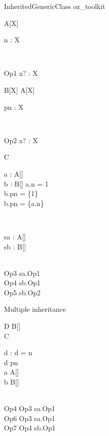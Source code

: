 \begin{zsection}
  \SECTION InheritedGenericClass \parents oz\_toolkit
\end{zsection}

\begin{class}{A[X]}
  \begin{state}
    n : X
  \end{state}\\
  \begin{op}{Op1}
    x? : X
  \end{op}
\end{class}

\begin{class}{B[X]}
  A[X]\\
  \begin{state}
    pn : \power X
  \end{state}\\
  \begin{op}{Op2}
    x? : \power X
  \end{op}
\end{class}

\begin{class}{C}
  \begin{axdef}
    a : A[\nat]\\
    b : B[\nat]
  \where
    a.n = 1\\
    b.pn = \{1\}\\
    b.pn = \{a.n\}
  \end{axdef}\\
  \begin{state}
    sa : A[\nat]\\
    sb : B[\nat]
  \end{state}\\
  Op3 \sdef sa.Op1\\
  Op4 \sdef sb.Op1\\
  Op5 \sdef sb.Op2
\end{class}

Multiple inheritance
\begin{class}{D}
  B[\nat]\\
  C\\
  \begin{state}
    d : \nat
  \where
    d = n\\
    d \in pn\\
    a \in A[\nat]\\
    b \in B[\nat]
  \end{state}\\
  Op4 \sdef Op3 \land sa.Op1\\
  Op6 \sdef Op3 \land sa.Op1\\
  Op7 \sdef Op4 \land sb.Op1
\end{class}


